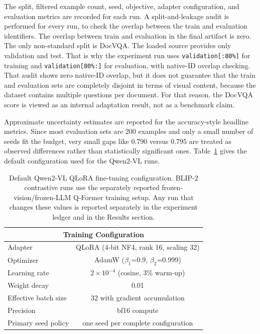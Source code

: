 \documentclass[12pt,bibliography=totoc,listof=totoc,BCOR=5mm,DIV=12,oneside,open=any]{scrbook}
\begin{document}
The split, filtered example count, seed, objective, adapter configuration, and evaluation metrics are recorded for each run.
A split-and-leakage audit is performed for every run, to check the overlap between the train and evaluation identifiers.
The overlap between train and evaluation in the final artifact is zero.
The only non-standard split is DocVQA.
The loaded source provides only validation and test.
That is why the experiment run uses \texttt{validation[:80\%]} for training and \texttt{validation[80\%:]} for evaluation, with native-ID overlap checking.
That audit shows zero native-ID overlap, but it does not guarantee that the train and evaluation sets are completely disjoint in terms of visual content, because the dataset contains multiple questions per document.
For that reason, the DocVQA score is viewed as an internal adaptation result, not as a benchmark claim.

Approximate uncertainty estimates are reported for the accuracy-style headline metrics.
Since most evaluation sets are 200 examples and only a small number of seeds fit the budget,
very small gaps like 0.790 versus 0.795 are treated as observed differences rather than statistically significant ones.
Table~\ref{tab:Config} gives the default configuration used for the Qwen2-VL runs.

\begin{table}[!ht]
\centering
\caption{Default Qwen2-VL QLoRA fine-tuning configuration. BLIP-2 contrastive runs use the separately reported frozen-vision/frozen-LLM Q-Former training setup. Any run that changes these values is reported separately in the experiment ledger and in the Results section.}
\label{tab:Config}
\begin{tabular}{|l|c|}
\hline
\multicolumn{2}{|c|}{\textbf{Training Configuration}} \\ \hline
Adapter & QLoRA (4-bit NF4, rank 16, scaling 32) \\
Optimizer & AdamW ($\beta_1$=0.9, $\beta_2$=0.999) \\
Learning rate & $2 \times 10^{-4}$ (cosine, 3\% warm-up) \\
Weight decay & 0.01 \\
Effective batch size & 32 with gradient accumulation \\
Precision & bf16 compute \\
Primary seed policy & one seed per complete configuration \\ \hline
\end{tabular}
\end{table}
\end{document}
